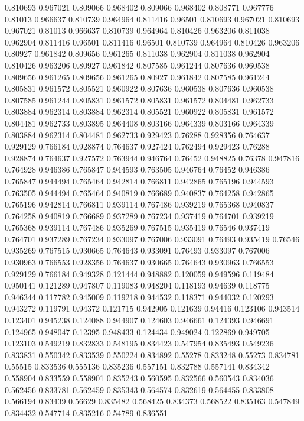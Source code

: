 0.810693 0.967021
0.809066 0.968402
0.809066 0.968402
0.808771 0.967776
0.81013 0.966637
0.810739 0.964964
0.811416 0.96501
0.810693 0.967021
0.810693 0.967021
0.81013 0.966637
0.810739 0.964964
0.810426 0.963206
0.811038 0.962904
0.811416 0.96501
0.811416 0.96501
0.810739 0.964964
0.810426 0.963206
0.80927 0.961842
0.809656 0.961265
0.811038 0.962904
0.811038 0.962904
0.810426 0.963206
0.80927 0.961842
0.807585 0.961244
0.807636 0.960538
0.809656 0.961265
0.809656 0.961265
0.80927 0.961842
0.807585 0.961244
0.805831 0.961572
0.805521 0.960922
0.807636 0.960538
0.807636 0.960538
0.807585 0.961244
0.805831 0.961572
0.805831 0.961572
0.804481 0.962733
0.803884 0.962314
0.803884 0.962314
0.805521 0.960922
0.805831 0.961572
0.804481 0.962733
0.803895 0.964408
0.803166 0.964339
0.803166 0.964339
0.803884 0.962314
0.804481 0.962733
0.929423 0.76288
0.928356 0.764637
0.929129 0.766184
0.928874 0.764637
0.927424 0.762494
0.929423 0.76288
0.928874 0.764637
0.927572 0.763944
0.946764 0.76452
0.948825 0.76378
0.947816 0.764928
0.946386 0.765847
0.944593 0.763505
0.946764 0.76452
0.946386 0.765847
0.944494 0.765464
0.942814 0.766811
0.942865 0.765196
0.944593 0.763505
0.944494 0.765464
0.940819 0.766689
0.940837 0.764258
0.942865 0.765196
0.942814 0.766811
0.939114 0.767486
0.939219 0.765368
0.940837 0.764258
0.940819 0.766689
0.937289 0.767234
0.937419 0.764701
0.939219 0.765368
0.939114 0.767486
0.935269 0.767515
0.935419 0.76546
0.937419 0.764701
0.937289 0.767234
0.933097 0.767006
0.933091 0.76493
0.935419 0.76546
0.935269 0.767515
0.930665 0.764643
0.933091 0.76493
0.933097 0.767006
0.930963 0.766553
0.928356 0.764637
0.930665 0.764643
0.930963 0.766553
0.929129 0.766184
0.949328 0.121444
0.948882 0.120059
0.949596 0.119484
0.950141 0.121289
0.947807 0.119083
0.948204 0.118193
0.94639 0.118775
0.946344 0.117782
0.945009 0.119218
0.944532 0.118371
0.944032 0.120293
0.943272 0.119791
0.94372 0.121715
0.942905 0.121639
0.94416 0.123106
0.943514 0.123401
0.945238 0.124088
0.944907 0.124603
0.946661 0.124393
0.946691 0.124965
0.948047 0.12395
0.948433 0.124434
0.949024 0.122869
0.949705 0.123103
0.549219 0.832833
0.548195 0.834423
0.547954 0.835493
0.549236 0.833831
0.550342 0.833539
0.550224 0.834892
0.55278 0.833248
0.55273 0.834781
0.55515 0.833536
0.555136 0.835236
0.557151 0.832788
0.557141 0.834342
0.558904 0.833559
0.558901 0.835243
0.560595 0.832566
0.560543 0.834036
0.562456 0.833781
0.562459 0.835343
0.564574 0.832619
0.564455 0.833808
0.566194 0.83439
0.56629 0.835482
0.568425 0.834373
0.568522 0.835163
0.547849 0.834432
0.547714 0.835216
0.54789 0.836551
